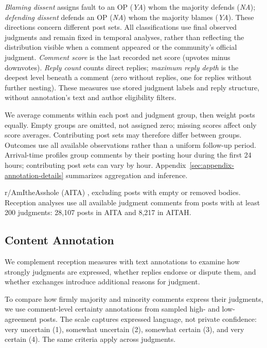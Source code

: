 \emph{Blaming dissent} assigns fault to an OP (\emph{YA}) whom the majority defends (\emph{NA});
\emph{defending dissent} defends an OP (\emph{NA}) whom the majority blames (\emph{YA}).
These directions concern different post sets. All classifications use
final observed judgments and remain fixed in temporal analyses, rather
than reflecting the distribution visible when a comment appeared or
the community's official judgment.
\emph{Comment score} is the last recorded net score (upvotes minus downvotes).
\emph{Reply count} counts direct replies; \emph{maximum reply depth}
is the deepest level beneath a comment (zero without replies,
one for replies without further nesting). These measures use stored judgment labels
and reply structure, without annotation's text and author eligibility filters.

We average comments within each post and judgment group, then weight
posts equally. Empty groups are omitted, not assigned zero; missing
scores affect only score averages. Contributing post sets may therefore
differ between groups. Outcomes use all available observations rather
than a uniform follow-up period. Arrival-time profiles group comments by
their posting hour during the first 24 hours; contributing post sets can
vary by hour. Appendix~\ref{sec:appendix-annotation-details} summarizes
aggregation and inference.

 r/AmItheAsshole (AITA) , 
excluding posts with empty or removed bodies.
Reception analyses use all available
judgment comments from posts with at least 200 judgments: 28,107 posts
in AITA and 8,217 in AITAH.


\subsection{Content Annotation}
\label{subsec:method-annotation}

We complement reception measures with text annotations to examine how
strongly judgments are expressed, whether replies endorse or dispute
them, and whether exchanges introduce additional reasons for judgment.

To compare how firmly majority and minority comments express their judgments,
we use comment-level certainty annotations from sampled high- and
low-agreement posts. The scale captures
expressed language, not private confidence: very uncertain (1), somewhat
uncertain (2), somewhat certain (3), and very certain (4). The same
criteria apply across judgments.

